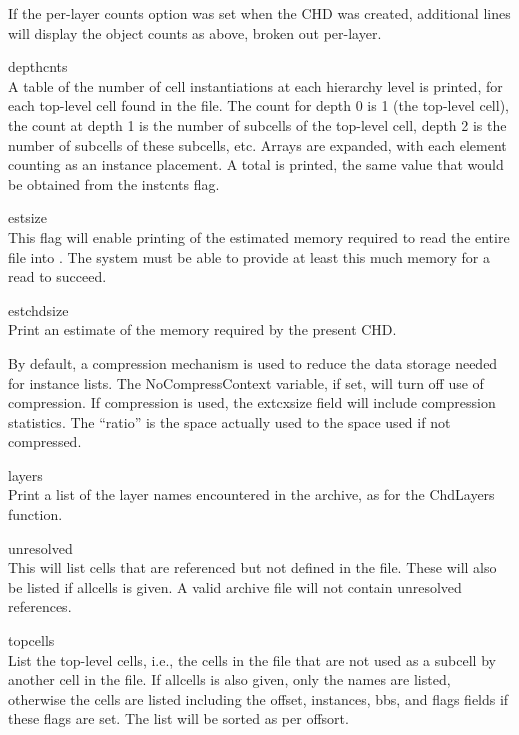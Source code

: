 \begin{description}
\begin{description}
If the per-layer counts option was set when the CHD was created,
additional lines will display the object counts as above, broken out
per-layer.

\item{\vt depthcnts}\\
A table of the number of cell instantiations at each hierarchy level
is printed, for each top-level cell found in the file.  The count for
depth 0 is 1 (the top-level cell), the count at depth 1 is the number
of subcells of the top-level cell, depth 2 is the number of subcells
of these subcells, etc.  Arrays are expanded, with each element
counting as an instance placement.  A total is printed, the same
value that would be obtained from the {\vt instcnts} flag.

\item{\vt estsize}\\
This flag will enable printing of the estimated memory required to
read the entire file into {\Xic}.  The system must be able to provide
at least this much memory for a read to succeed.

\item{\vt estchdsize}\\
Print an estimate of the memory required by the present CHD.

By default, a compression mechanism is used to reduce the data storage
needed for instance lists.  The {\et NoCompressContext} variable, if
set, will turn off use of compression.  If compression is used, the
{\vt extcxsize} field will include compression statistics.  The
``ratio'' is the space actually used to the space used if not
compressed.

\item{\vt layers}\\
Print a list of the layer names encountered in the archive, as for the
{\vt ChdLayers} function.

\item{\vt unresolved}\\
This will list cells that are referenced but not defined in the file. 
These will also be listed if {\vt allcells} is given.  A valid archive
file will not contain unresolved references.

\item{\vt topcells}\\
List the top-level cells, i.e., the cells in the file that are not
used as a subcell by another cell in the file.  If {\vt allcells} is
also given, only the names are listed, otherwise the cells are listed
including the {\vt offset}, {\vt instances}, {\vt bbs}, and {\vt
flags} fields if these flags are set.  The list will be sorted as per
{\vt offsort}.


\end{description}
\end{description}
